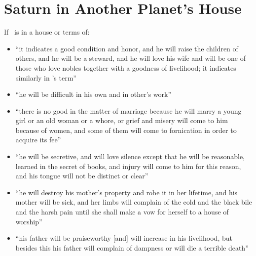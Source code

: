 \section{Saturn in Another Planet's House}
If \Saturn\, is in a house or terms of:
\begin{itemize}[topsep=0em,itemsep=0em]
\item[\Jupiter] ``it indicates a good condition and honor, and he will raise the children of others, and he will be a steward, and he will love his wife and will be one of those who love nobles together with a goodness of livelihood; it indicates similarly in \Jupiter's term''

\item[\Mars] ``he will be difficult in his own and in other's work''

\item[\Venus] ``there is no good in the matter of marriage because he will marry a young girl or an old woman or a whore, or grief and misery will come to him because of women, and some of them will come to fornication in order to acquire its fee''

\item[\Mercury] ``he will be secretive, and will love silence except that he will be reasonable, learned in the secret of books, and injury will come to him for this reason, and his tongue will not be distinct or clear''

\item[\Moon] ``he will destroy his mother's property and robe it in her lifetime, and his mother will be sick, and her limbs will complain of the cold and the black bile and the harsh pain until she shall make a vow for herself to a house of worship''

\item[\Sun] ``his father will be praiseworthy [and] will increase in his livelihood, but besides this his father will complain of dampness or will die a terrible death''


\end{itemize}